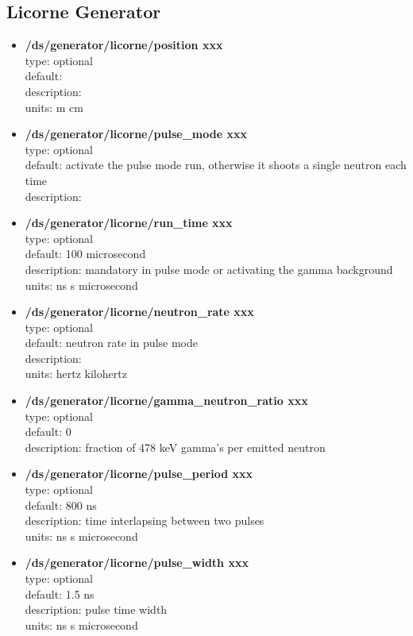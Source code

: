 \documentclass[twocolumn, 10pt]{article}
\begin{document}
\subsection{Licorne Generator}
\begin{itemize}
\item \textbf{/ds/generator/licorne/position   xxx}\\
type: optional \\
default: \\
description:  \\
units: m cm \\

\item \textbf{/ds/generator/licorne/pulse\_mode   xxx}\\
type: optional \\
default: activate the pulse mode run, otherwise it shoots a single neutron each time\\
description:  \\

\item \textbf{/ds/generator/licorne/run\_time   xxx}\\
type: optional \\
default: 100 microsecond\\
description:  mandatory in pulse mode or activating the gamma background\\
units: ns s microsecond \\

\item \textbf{/ds/generator/licorne/neutron\_rate   xxx}\\
type: optional \\
default: neutron rate in pulse mode\\
description:  \\
units: hertz kilohertz \\

\item \textbf{/ds/generator/licorne/gamma\_neutron\_ratio   xxx}\\
type: optional \\
default: 0 \\
description:  fraction of 478 keV gamma's per emitted neutron\\

\item \textbf{/ds/generator/licorne/pulse\_period   xxx}\\
type: optional \\
default: 800 ns\\
description: time interlapsing between two pulses  \\
units: ns s microsecond \\

\item \textbf{/ds/generator/licorne/pulse\_width   xxx}\\
type: optional \\
default: 1.5 ns\\
description: pulse time width \\
units: ns s microsecond \\
\end{itemize}
\end{document}
